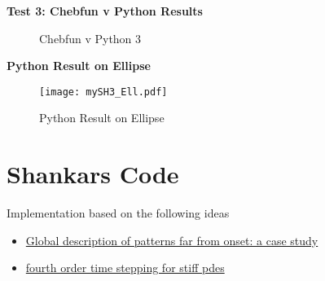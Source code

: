 \documentclass[12pt]{article}
\begin{document}
\textbf{Test 3: Chebfun v Python Results}
\begin{figure}[!tbp]
  \centering
  \hfill
  \caption{Chebfun v Python 3}
\end{figure}
\FloatBarrier

\textbf{Python Result on Ellipse}
\begin{figure}[ht]
        \centering
        \texttt{[image: mySH3\_Ell.pdf]}
        \label{fig:1}
        \caption{Python Result on Ellipse}
\end{figure}
\FloatBarrier
\section{Shankars Code}
Implementation based on the following ideas
\begin{itemize}
    \item \href{https://pdf.sciencedirectassets.com/271587/1-s2.0-S0167278900X03715/1-s2.0-S0167278903002173/main.pdf?X-Amz-Security-Token=IQoJb3JpZ2luX2VjEL7%2F%2F%2F%2F%2F%2F%2F%2F%2F%2FwEaCXVzLWVhc3QtMSJHMEUCICRsLgYF2ZCtLPeAeGW%2BEPXnS%2FWquSupOQw3Jqlxm2O0AiEA%2FPlgLb01YtU6iq031C59mj2ZlGLlXwZ9L8qtR9ktMnIq1QQIl%2F%2F%2F%2F%2F%2F%2F%2F%2F%2F%2FARAFGgwwNTkwMDM1NDY4NjUiDAAlY3t4I4aD%2Bi1hCCqpBNe5MXklYYsWHidQ9Y5m%2B7bHcPH3f0J494pR5vgp3UeyP%2F76llxKrAQaa2mddT3GgeUG96aajcSu1ZMXu%2BSQ1kWgrqboJIyazdlsSBZ7qRPpqIQwKw8BLhSfS%2B9nXLFW1h%2FN3cwNTuobCoro3U5GM8xbHLJVwNMrlyYXYN49QjjWdmaas1rx08RIWGQNEUhSWVjMwVp1pG79B8B8nmgmZc0diVECxX7Y2FZ%2Bhw4YPM63SE3AyVlPuinZV%2FyBxg4R3rnNqZHpI5RJ3rWoIgrhxafRnfFYzYzAx%2BXwNNOX4nLSVeE5T81lkyG%2BRYVBOvTBYpeJf3sRDiT00cuwjZ4mp220pOoOONLG%2FOYIu0ngsMOq5fjcNwE1dfJsQ1PMmKbNWc%2F8CV2YpEhUGNB%2FoE4C4QmVPBTrrj0jwOAXQxttjOfJV8RPuBFPwBoc7mv6KfT9QdU5ZqW8F%2BxprX8dHYXwbNX2Z4xI%2F0UpIh8zfxaXttR3Jk%2B0zLVSEpopdm6GvB5cBKvOGfsk7xKX8xAac4sEpVDLu45R%2FpF8TsYd7ifS8%2Bx9QsmvKxEgGaNL9U7PtYllywr9nq1HfvI6taQohvgl2CZ39tOFCqFKMIZ946JIbr9QCLVS2NtCeK5G7x9HAt2g7TyMGshz%2BZ4sirkKMhXuUz1No1DriQLE7y1H2TEZFxnWqCC%2BD1HYFnknBiZooKvx5MyxMHk6ruxZuJVIeiQNJMCjtkIbdLlGo14woL%2FRmgY6qQGusRKMKK6QnsDSKiwILSzQLkaH7hfPpdsK4kw0l8xNBFKY0DZP5WJR4PTFOynTq7dtAbTH329Sta0zNmMIzBTIIEL4%2Fk3wjMVXOb5vRl31tiI%2Fz7QSiiT2NA0yS8WDbaj3kt7bL7r%2Frh%2BS%2BobBKwApTCjf1OF2jp%2BSXJ30gtq%2ByWA9dd7XeCfXSFviFUyrsVgiHHLsmUKbG1%2B%2F85sKNykVhayJWUFumG1V&X-Amz-Algorithm=AWS4-HMAC-SHA256&X-Amz-Date=20221022T221043Z&X-Amz-SignedHeaders=host&X-Amz-Expires=300&X-Amz-Credential=ASIAQ3PHCVTYYONMYOOY%2F20221022%2Fus-east-1%2Fs3%2Faws4_request&X-Amz-Signature=65bf35dff011eb3c546d4f4c35a77a03600ec32c0a2f2757dbe6dab6f657e17a&hash=ed27966f55f0b902ad05f7ea1b2d62770c7f609e57e43c8a60fd3bde490d2cdc&host=68042c943591013ac2b2430a89b270f6af2c76d8dfd086a07176afe7c76c2c61&pii=S0167278903002173&tid=spdf-43c88fc2-f771-4981-bcac-11dd0500a139&sid=be390999998170433b1b80b84a1da76fb835gxrqa&type=client&ua=575104555c545a5c&rr=75e59089cff0a708}{Global description of patterns far from onset: a case study}
    \item \href{https://epubs-siam-org.ezproxy2.library.arizona.edu/doi/epdf/10.1137/S1064827502410633}{fourth order time stepping for stiff pdes}
\end{itemize}
\end{document}
